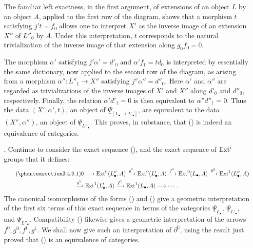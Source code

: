 The familiar left exactness, in the first argument, of extensions
of an object $L$ by an object $A$, applied to the first row of the
diagram, shows that a morphism $t$ satisfying $j't=f_0$ allows one
to interpret $X'$ as the inverse image of an extension $X''$ of
$L''_0$ by $A$.  Under this interpretation, $t$ corresponds to the
natural trivialization of the inverse image of that extension along
$g_0f_0=0$.

The morphism $\alpha'$ satisfying $j'\alpha'=d'_0$ and
$\alpha'f_1=td_0$ is interpreted by essentially the same dictionary,
now applied to the second row of the diagram, as arising from a
morphism $\alpha'':L''_1\longrightarrow X''$ satisfying
$j''\alpha''=d''_0$.  Here $\alpha'$ and $\alpha''$ are regarded as
trivializations of the inverse images of $X'$ and $X''$ along
$d'_0$ and $d''_0$, respectively.  Finally, the relation
$\alpha'd'_1=0$ is then equivalent to $\alpha''d''_1=0$.  Thus the
data $(X',\alpha',t)$, an object of
$\underline\Psi_{[L_\bullet\longrightarrow L'_\bullet]}$, are
equivalent to the data $(X'',\alpha'')$, an object of
$\underline\Psi_{L''_\bullet}$.  This proves, in substance, that
() is indeed an equivalence of categories.

. Continue to consider the exact sequence (), and the
exact sequence of $\operatorname{Ext}^i$ groups that it defines:
\begin{multline}\tag{\SGARefTarget{sga7.sga7i.evii.n3-4-9-1}{3.4.9.1}}
 0\longrightarrow\Ext^0(L''_\bullet,A)
 \xrightarrow{g^0}\Ext^0(L'_\bullet,A)
 \xrightarrow{f^0}\Ext^0(L_\bullet,A)
 \xrightarrow{\partial^0}\Ext^1(L''_\bullet,A)\\
 \xrightarrow{g^1}\Ext^1(L'_\bullet,A)
 \xrightarrow{f^1}\Ext^1(L_\bullet,A)\longrightarrow\cdots.
\end{multline}
The canonical isomorphisms of the forms () and () give a
geometric interpretation of the first six terms of this exact
sequence in terms of the categories $\underline\Psi_{L_\bullet}$,
$\underline\Psi_{L'_\bullet}$, and
$\underline\Psi_{L''_\bullet}$.  Compatibility () likewise
gives a geometric interpretation of the arrows
$f^0,g^0,f^1,g^1$.  We shall now give such an interpretation of
$\partial^0$, using the result just proved that () is an
equivalence of categories.

